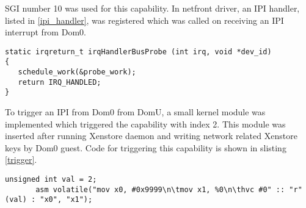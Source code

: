 SGI number 10 was used for this capability. In netfront driver, an IPI handler, listed in \ref{ipi_handler}, was registered which was called on receiving an IPI interrupt from Dom0.

\begin{lstlisting}[caption= IPI handler for receiving notification from Dom0 about successful running of Xenstore and netback driver ,label={ipi_handler}]
static irqreturn_t irqHandlerBusProbe (int irq, void *dev_id)
{
   schedule_work(&probe_work);
   return IRQ_HANDLED;
}

\end{lstlisting}
To trigger an IPI from Dom0 from DomU, a small kernel module was implemented which triggered the capability with index 2. This module was inserted after running Xenstore daemon and writing network related Xenstore keys by Dom0 guest. Code for triggering this capability is shown in slisting \ref{trigger}.

\begin{lstlisting}[caption=Code to trigger capability 2 from Dom0 to DomU ,label={trigger}]
       unsigned int val = 2;
       asm volatile("mov x0, #0x9999\n\tmov x1, %0\n\thvc #0" :: "r" (val) : "x0", "x1");
\end{lstlisting}

